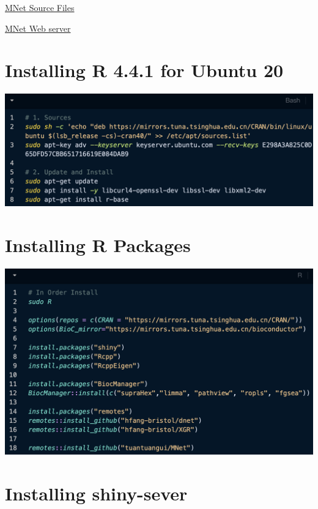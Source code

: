 \documentclass[
]{book}
\begin{document}
\href{https://github.com/tuantuangui/MNet}{MNet Source Files}

\href{http://www.mnet4all.com/MNet/}{MNet Web server}

\section{Installing R 4.4.1 for Ubuntu 20}\label{installing-r-4.4.1-for-ubuntu-20}

\begin{center}\includegraphics[width=25.08in]{figure/3.1} \end{center}

\section{Installing R Packages}\label{installing-r-packages}

\begin{center}\includegraphics[width=24.83in]{figure/3.2} \end{center}

\section{Installing shiny-sever}\label{installing-shiny-sever}
\end{document}
